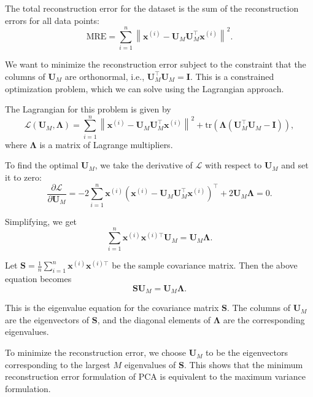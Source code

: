The total reconstruction error for the dataset is the sum of the reconstruction errors for all data points:
\[
    \text{MRE} = \sum_{i=1}^{n} \left\| \mathbf{x}^{(i)} - \mathbf{U}_M \mathbf{U}_M^\top \mathbf{x}^{(i)} \right\|^2.
\]

We want to minimize the reconstruction error subject to the constraint that the columns of \( \mathbf{U}_M \) are orthonormal, i.e., \( \mathbf{U}_M^\top \mathbf{U}_M = \mathbf{I} \). This is a constrained optimization problem, which we can solve using the Lagrangian approach.

The Lagrangian for this problem is given by
\[
    \mathcal{L}(\mathbf{U}_M, \mathbf{\Lambda}) = \sum_{i=1}^{n} \left\| \mathbf{x}^{(i)} - \mathbf{U}_M \mathbf{U}_M^\top \mathbf{x}^{(i)} \right\|^2 + \text{tr} \left( \mathbf{\Lambda} (\mathbf{U}_M^\top \mathbf{U}_M - \mathbf{I}) \right),
\]
where \( \mathbf{\Lambda} \) is a matrix of Lagrange multipliers.

To find the optimal \( \mathbf{U}_M \), we take the derivative of \( \mathcal{L} \) with respect to \( \mathbf{U}_M \) and set it to zero:
\[
    \frac{\partial \mathcal{L}}{\partial \mathbf{U}_M} = -2 \sum_{i=1}^{n} \mathbf{x}^{(i)} (\mathbf{x}^{(i)} - \mathbf{U}_M \mathbf{U}_M^\top \mathbf{x}^{(i)})^\top + 2 \mathbf{U}_M \mathbf{\Lambda} = 0.
\]

Simplifying, we get
\[
    \sum_{i=1}^{n} \mathbf{x}^{(i)} \mathbf{x}^{(i)\top} \mathbf{U}_M = \mathbf{U}_M \mathbf{\Lambda}.
\]

Let \( \mathbf{S} = \frac{1}{n} \sum_{i=1}^{n} \mathbf{x}^{(i)} \mathbf{x}^{(i)\top} \) be the sample covariance matrix. Then the above equation becomes
\[
    \mathbf{S} \mathbf{U}_M = \mathbf{U}_M \mathbf{\Lambda}.
\]

This is the eigenvalue equation for the covariance matrix \( \mathbf{S} \). The columns of \( \mathbf{U}_M \) are the eigenvectors of \( \mathbf{S} \), and the diagonal elements of \( \mathbf{\Lambda} \) are the corresponding eigenvalues.

To minimize the reconstruction error, we choose \( \mathbf{U}_M \) to be the eigenvectors corresponding to the largest \( M \) eigenvalues of \( \mathbf{S} \). This shows that the minimum reconstruction error formulation of PCA is equivalent to the maximum variance formulation.
